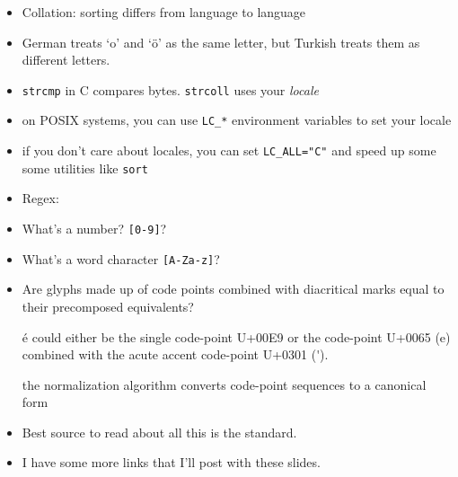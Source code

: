 \documentclass[%
        hyperref={%
                pdfauthor={Zakariyya Mughal},%
                pdfpagemode={None},pdfpagelayout={SinglePage}}%
        xcolor={x11names},%
]{beamer}
\begin{document}
\begin{frame}
\begin{itemize}
\item Collation: sorting differs from language to language
\pause\item German treats `o' and `\"o' as the same letter, but
Turkish treats them as different letters.
\pause\item \texttt{strcmp} in C compares bytes. \texttt{strcoll} uses
your \emph{locale}
\item on POSIX systems, you can use \texttt{LC\_*} environment variables to set
your locale
\pause\item if you don't care about locales, you can set
\texttt{LC\_ALL="C"} and speed up some some utilities like
\texttt{sort}
\end{itemize}
\end{frame}

\begin{frame}
\begin{itemize}
\item Regex:
\item What's a number? \texttt{[0-9]}?
\item What's a word character \texttt{[A-Za-z]}?
\item Are glyphs made up of code points combined with diacritical
marks equal to their precomposed equivalents?

\'e could either be the single code-point U+00E9 or the code-point U+0065 (e) combined with the acute
accent code-point U+0301 (\'{}).

\pause the normalization algorithm converts code-point sequences to
a canonical form
\end{itemize}
\end{frame}

\begin{frame}
\begin{itemize}
\item Best source to read about all this is the standard.
\item I have some more links that I'll post with these slides.
\end{itemize}
\end{frame}
\end{document}
